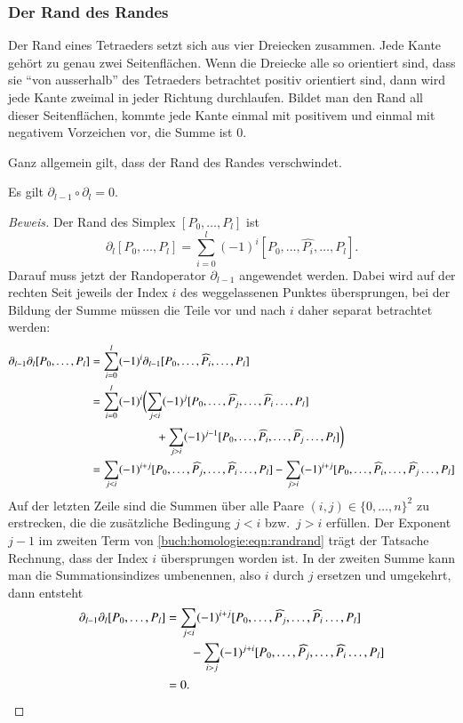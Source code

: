 \subsubsection{Der Rand des Randes}
Der Rand eines Tetraeders setzt sich aus vier Dreiecken
zusammen.
Jede Kante gehört zu genau zwei Seitenflächen. 
Wenn die Dreiecke alle so orientiert sind, dass sie ``von ausserhalb''
des Tetraeders betrachtet positiv orientiert sind, dann wird jede
Kante zweimal in jeder Richtung durchlaufen.
Bildet man den Rand all dieser Seitenflächen, kommte jede Kante
einmal mit positivem und einmal mit negativem Vorzeichen vor,
die Summe ist $0$.

Ganz allgemein gilt, dass der Rand des Randes verschwindet.

\begin{satz}
\label{buch:homologie:satz:randrand}
Es gilt $\partial_{l-1}\circ\partial_l=0$.
\end{satz}

\begin{proof}[Beweis]
Der Rand des Simplex $[P_0,\dots,P_l]$ ist
\[
\partial_l[P_0,\dots,P_l]
=
\sum_{i=0}^l (-1)^i [P_0,\dots,\widehat{P_i},\dots,P_l].
\]
Darauf muss jetzt der Randoperator $\partial_{l-1}$ angewendet
werden.
Dabei wird auf der rechten Seit jeweils der Index $i$ des weggelassenen
Punktes übersprungen, bei der Bildung der
Summe müssen die Teile vor und nach $i$ daher separat betrachtet werden:
\begin{align}
\partial_{l-1}\partial_l[P_0,\dots,P_l]
&=
\sum_{i=0}^l (-1)^i \partial_{l-1}[P_0,\dots,\widehat{P_i},\dots,P_l]
\notag
\\
&=
\sum_{i=0}^l (-1)^i
\biggl(
\sum_{j<i} (-1)^j
[P_0,\dots,\widehat{P_j},\dots,\widehat{P_i}\dots,P_l]
\notag
\\
&\hspace*{2cm}
+
\sum_{j>i} (-1)^{j-1}
[P_0,\dots,\widehat{P_i},\dots,\widehat{P_j}\dots,P_l]
\biggr)
\label{buch:homologie:eqn:randrand}
\\
&=
\sum_{j<i} (-1)^{i+j}
[P_0,\dots,\widehat{P_j},\dots,\widehat{P_i}\dots,P_l]
-
\sum_{j>i} (-1)^{i+j}
[P_0,\dots,\widehat{P_i},\dots,\widehat{P_j}\dots,P_l]
\notag
\end{align}
Auf der letzten Zeile sind die Summen über alle Paare
$(i,j)\in\{0,\dots,n\}^2$ zu erstrecken, die die zusätzliche
Bedingung $j<i$ bzw.~$j>i$ erfüllen.
Der Exponent $j-1$ im zweiten Term von
\eqref{buch:homologie:eqn:randrand}
trägt der Tatsache Rechnung,
dass der Index $i$ übersprungen worden ist.
In der zweiten Summe kann man die Summationsindizes umbenennen,
also $i$ durch $j$ ersetzen und umgekehrt, dann entsteht
\begin{align*}
\partial_{l-1}\partial_l[P_0,\dots,P_l]
&=
\sum_{j<i} (-1)^{i+j}
[P_0,\dots,\widehat{P_j},\dots,\widehat{P_i}\dots,P_l]
\\
&\qquad
-
\sum_{i>j} (-1)^{j+i}
[P_0,\dots,\widehat{P_j},\dots,\widehat{P_i}\dots,P_l]
\\
&=0.
\qedhere
\end{align*}
\end{proof}

